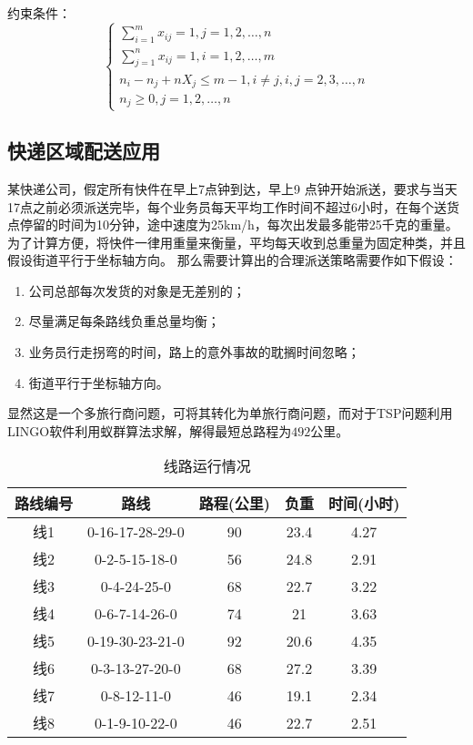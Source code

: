 约束条件：
\begin{equation}
 \left\{\begin{array}{l}
\sum_{i=1}^{m} x_{i j}=1, j=1,2, \ldots, n \\
\sum_{j=1}^{n} x_{i j}=1, i=1,2, \ldots, m \\
n_{i}-n_{j}+n X_{j} \leq m-1, i \neq j, i, j=2,3, \ldots, n \\
n_{j} \geq 0, j=1,2, \ldots, n
\end{array}\right.
\end{equation}


\subsection{快递区域配送应用}
\par 某快递公司，假定所有快件在早上7点钟到达，早上9 点钟开始派送，要求与当天17点之前必须派送完毕，每个业务员每天平均工作时间不超过6小时，在每个送货点停留的时间为10分钟，途中速度为25km/h，每次出发最多能带25千克的重量。为了计算方便，将快件一律用重量来衡量，平均每天收到总重量为固定种类，并且假设街道平行于坐标轴方向。
那么需要计算出的合理派送策略需要作如下假设：
\begin{enumerate}
    \item 公司总部每次发货的对象是无差别的；
    \item 尽量满足每条路线负重总量均衡； 
    \item 业务员行走拐弯的时间，路上的意外事故的耽搁时间忽略； 
    \item 街道平行于坐标轴方向。 
\end{enumerate}
\par 显然这是一个多旅行商问题，可将其转化为单旅行商问题，而对于TSP问题利用LINGO软件利用蚁群算法求解，解得最短总路程为$492$公里。

\begin{table}[!ht]
    \centering
        \caption{线路运行情况}
    \begin{tabular}{|c|c|c|c|c|}
    \hline 
  路线编号   &  路线        &路程(公里) & 负重     &	时间(小时)  \\ \hline
       线1  &  0-16-17-28-29-0 &	90	& 23.4    &	4.27  \\ \hline
       线2  & 0-2-5-15-18-0    &	56	& 24.8    &	  2.91   \\ \hline
       线3  & 0-4-24-25-0      &	68	& 22.7    &	 3.22   \\ \hline
       线4  & 0-6-7-14-26-0    &   74  &  21     &	3.63   \\ \hline
       线5  & 0-19-30-23-21-0  &	92	& 20.6   &	4.35   \\ \hline
       线6  & 0-3-13-27-20-0   &	68	& 27.2   &	3.39   \\ \hline
       线7  & 0-8-12-11-0      &	46	& 19.1   &	2.34   \\ \hline
       线8  & 0-1-9-10-22-0    &	46	& 22.7   &	2.51   \\ \hline
    \end{tabular}
\end{table}

